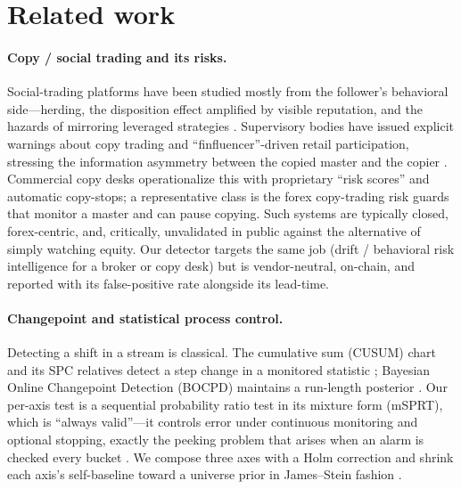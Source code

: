 \documentclass[11pt,a4paper]{article}
\begin{document}
\section{Related work}
\label{sec:related}

\paragraph{Copy / social trading and its risks.}
Social-trading platforms have been studied mostly from the follower's behavioral
side---herding, the disposition effect amplified by visible reputation, and the
hazards of mirroring leveraged strategies
\citep{pelster2019socialtrading,barber2000trading}. Supervisory bodies have issued
explicit warnings about copy trading and ``finfluencer''-driven retail
participation, stressing the information asymmetry between the copied master and
the copier \citep{iosco2025imitative,esma2023copytrading}. Commercial copy
desks operationalize this with proprietary ``risk scores'' and automatic
copy-stops; a representative class is the forex copy-trading risk guards that monitor
a master and can pause copying. Such systems are typically closed, forex-centric,
and, critically, unvalidated in public against the alternative of simply watching
equity. Our detector targets the same job (drift / behavioral risk intelligence for
a broker or copy desk) but is vendor-neutral, on-chain, and reported with its
false-positive rate alongside its lead-time.

\paragraph{Changepoint and statistical process control.}
Detecting a shift in a stream is classical. The cumulative sum (CUSUM) chart and
its SPC relatives detect a step change in a monitored statistic
\citep{page1954cusum,montgomery2009spc}; Bayesian Online Changepoint Detection
(BOCPD) maintains a run-length posterior \citep{adams2007bocpd}. Our per-axis test
is a sequential probability ratio test \citep{wald1945sprt} in its mixture form
(mSPRT), which is ``always valid''---it controls error under continuous monitoring
and optional stopping, exactly the peeking problem that arises when an alarm is
checked every bucket \citep{johari2017peeking}. We compose three axes with a
Holm correction \citep{holm1979simple} and shrink each axis's self-baseline toward
a universe prior in James--Stein fashion \citep{james1961stein}.
\end{document}
